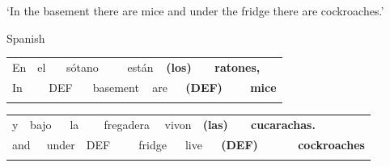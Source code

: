 \begin{styleTranslation}
‘In the basement there are mice and under the fridge there are cockroaches.’  

\end{styleTranslation}

\begin{listWWNumileveli}
\item 

\begin{styleExample}
\label{bkm:Ref172696740}Spanish

\end{styleExample}

\end{listWWNumileveli}

\begin{tabular}{llllllllllll}
\lsptoprule
En & \multicolumn{2}{l}{el

} & \multicolumn{2}{l}{sótano

} & \multicolumn{2}{l}{están

} & \multicolumn{2}{l}{{\bfseries *(los)}

} & \multicolumn{2}{l}{{\bfseries ratones,}

} & \\
\multicolumn{2}{l}{In

} & \multicolumn{2}{l}{DEF

} & \multicolumn{2}{l}{basement

} & \multicolumn{2}{l}{are

} & \multicolumn{2}{l}{{\bfseries (DEF)}

} & \multicolumn{2}{l}{{\bfseries mice}

}\\
\lspbottomrule
\end{tabular}

\begin{tabular}{llllllllllllll}
\lsptoprule
y & \multicolumn{2}{l}{bajo

} & \multicolumn{2}{l}{la

} & \multicolumn{2}{l}{fregadera

} & \multicolumn{2}{l}{vivon

} & \multicolumn{2}{l}{{\bfseries *(las)}

} & \multicolumn{2}{l}{{\bfseries cucarachas.}

} & \\
\multicolumn{2}{l}{and

} & \multicolumn{2}{l}{under

} & \multicolumn{2}{l}{DEF

} & \multicolumn{2}{l}{fridge

} & \multicolumn{2}{l}{live

} & \multicolumn{2}{l}{{\bfseries (DEF)}

} & \multicolumn{2}{l}{{\bfseries cockroaches}

}\\
\lspbottomrule
\end{tabular}

